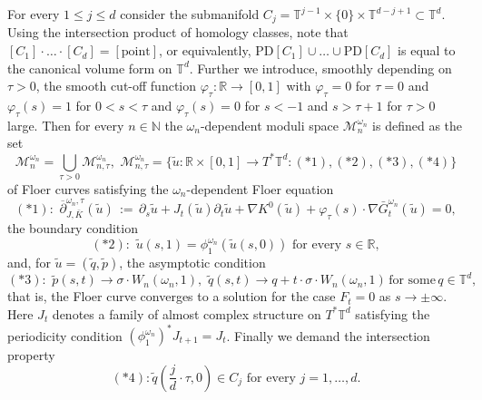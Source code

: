 \documentclass[a4paper,11pt]{amsart}
\newcommand{\NN}{\mathbb{N}}
\newcommand{\RR}{\mathbb{R}}
\newcommand{\TT}{\mathbb{T}}
\begin{document}
\indent For every $1\leq j\leq d$ consider the submanifold $C_j=\TT^{j-1}\times\{0\}\times\TT^{d-j+1}\subset\TT^d$. Using the intersection product of homology classes, note that $[C_1]\cdot\ldots\cdot [C_d]=[\textrm{point}]$, or equivalently, $\textrm{PD}[C_1]\cup\ldots\cup\textrm{PD}[C_d]$ is equal to the canonical volume form on $\TT^d$. Further we introduce, smoothly depending on $\tau>0$, the smooth cut-off function $\varphi_{\tau}:\RR\to [0,1]$ with $\varphi_{\tau}=0$ for $\tau=0$ and $\varphi_{\tau}(s)=1$ for $0<s<\tau$ and $\varphi_{\tau}(s)=0$ for $s<-1$ and $s>\tau+1$ for $\tau >0$ large. Then for every $n\in\NN$ the $\omega_n$-dependent moduli space $\mathcal{M}_n^{\omega_n}$ is defined as the set
\[\mathcal{M}_n^{\omega_n}=\bigcup_{\tau>0}\mathcal{M}_{n,\tau}^{\omega_n},\,\,\mathcal{M}_{n,\tau}^{\omega_n}=\{\widetilde{u}:\RR\times [0,1]\to T^*\TT^d: (*1),(*2),(*3),(*4)\}\] of Floer curves satisfying the $\omega_n$-dependent Floer equation 
\[(*1):\,\, \overline{\partial}^{\omega_n,\tau}_{J,\bar{K}}(\tilde{u})\,:=\,\partial_s\tilde{u}+J_t(\tilde{u})\partial_t\tilde{u}+\nabla K^0(\tilde{u})+\varphi_{\tau}(s)\cdot\nabla \bar{G}^{\omega_n}_t(\tilde{u})=0,\]
the boundary condition \[(*2):\,\,\widetilde{u}(s,1)=\phi^{\omega_n}_1(\widetilde{u}(s,0))\,\,\textrm{for every}\,\,s\in\RR,\] 
and, for $\widetilde{u}=(\widetilde{q},\widetilde{p})$, the asymptotic condition \[(*3):\,\,\widetilde{p}(s,t)\to \sigma\cdot W_n(\omega_n,1), \,\,\widetilde{q}(s,t)\to q+ t\cdot \sigma\cdot W_n(\omega_n,1)\,\textrm{for some}\,q\in\TT^d, \] that is, the Floer curve converges to a solution for the case $F_t=0$ as $s\to\pm\infty$. Here $J_t$ denotes a family of almost complex structure on $T^*\TT^d$ satisfying the periodicity condition $(\phi^{\omega_n}_1)^*J_{t+1}=J_t$. Finally we demand the intersection property \[(*4): \tilde{q}\left(\frac{j}{d}\cdot\tau,0\right)\in C_j\,\,\textrm{for every}\,\,j=1,\ldots,d.\]
\end{document}
